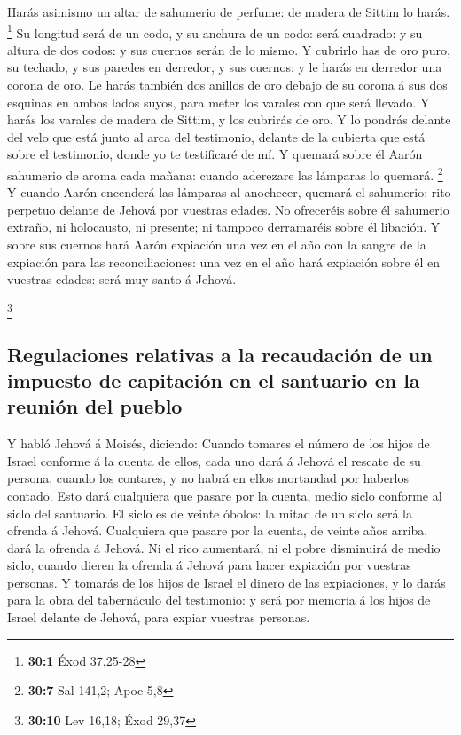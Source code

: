  Harás asimismo un altar de sahumerio de perfume: de
madera de Sittim lo harás. \footnote{\textbf{30:1} Éxod 37,25-28}
 Su longitud será de un codo, y su anchura de un codo:
será cuadrado: y su altura de dos codos: y sus cuernos serán de lo
mismo.  Y cubrirlo has de oro puro, su techado, y sus
paredes en derredor, y sus cuernos: y le harás en derredor una corona de
oro.  Le harás también dos anillos de oro debajo de su
corona á sus dos esquinas en ambos lados suyos, para meter los varales
con que será llevado.  Y harás los varales de madera de
Sittim, y los cubrirás de oro.  Y lo pondrás delante del
velo que está junto al arca del testimonio, delante de la cubierta que
está sobre el testimonio, donde yo te testificaré de mí. 
Y quemará sobre él Aarón sahumerio de aroma cada mañana: cuando
aderezare las lámparas lo quemará. \footnote{\textbf{30:7} Sal 141,2;
  Apoc 5,8}  Y cuando Aarón encenderá las lámparas al
anochecer, quemará el sahumerio: rito perpetuo delante de Jehová por
vuestras edades.  No ofreceréis sobre él sahumerio
extraño, ni holocausto, ni presente; ni tampoco derramaréis sobre él
libación.  Y sobre sus cuernos hará Aarón expiación una
vez en el año con la sangre de la expiación para las reconciliaciones:
una vez en el año hará expiación sobre él en vuestras edades: será muy
santo á Jehová.

\footnote{\textbf{30:10} Lev 16,18; Éxod 29,37}

\hypertarget{regulaciones-relativas-a-la-recaudaciuxf3n-de-un-impuesto-de-capitaciuxf3n-en-el-santuario-en-la-reuniuxf3n-del-pueblo}{%
\subsection{Regulaciones relativas a la recaudación de un impuesto de
capitación en el santuario en la reunión del
pueblo}\label{regulaciones-relativas-a-la-recaudaciuxf3n-de-un-impuesto-de-capitaciuxf3n-en-el-santuario-en-la-reuniuxf3n-del-pueblo}}

 Y habló Jehová á Moisés, diciendo: 
Cuando tomares el número de los hijos de Israel conforme á la cuenta de
ellos, cada uno dará á Jehová el rescate de su persona, cuando los
contares, y no habrá en ellos mortandad por haberlos contado.
 Esto dará cualquiera que pasare por la cuenta, medio
siclo conforme al siclo del santuario. El siclo es de veinte óbolos: la
mitad de un siclo será la ofrenda á Jehová.  Cualquiera
que pasare por la cuenta, de veinte años arriba, dará la ofrenda á
Jehová.  Ni el rico aumentará, ni el pobre disminuirá de
medio siclo, cuando dieren la ofrenda á Jehová para hacer expiación por
vuestras personas.  Y tomarás de los hijos de Israel el
dinero de las expiaciones, y lo darás para la obra del tabernáculo del
testimonio: y será por memoria á los hijos de Israel delante de Jehová,
para expiar vuestras personas.

